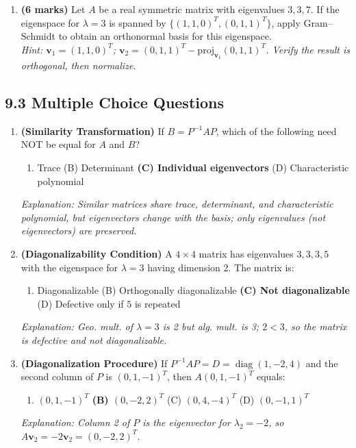 \documentclass[12pt,a4paper]{article}
\begin{document}
\begin{enumerate}[leftmargin=*, label=\textbf{D\arabic*.}]
  \item \textbf{(6 marks)} Let $A$ be a real symmetric matrix with eigenvalues $3, 3, 7$. If the eigenspace for $\lambda = 3$ is spanned by $\{(1,1,0)^T, (0,1,1)^T\}$, apply Gram--Schmidt to obtain an orthonormal basis for this eigenspace. \\
  \textit{Hint: $\mathbf{v}_1 = (1,1,0)^T$; $\mathbf{v}_2 = (0,1,1)^T - \text{proj}_{\mathbf{v}_1}(0,1,1)^T$. Verify the result is orthogonal, then normalize.}
\end{enumerate}

\subsection*{9.3 Multiple Choice Questions}

\begin{enumerate}[leftmargin=*, label=\textbf{MCQ\arabic*.}]
  \item \textbf{(Similarity Transformation)} If $B = P^{-1}AP$, which of the following need NOT be equal for $A$ and $B$?
  \begin{enumerate}[label=(\Alph*)]
    \item Trace \quad (B) Determinant \quad \textbf{(C) Individual eigenvectors} \quad (D) Characteristic polynomial
  \end{enumerate}
  \textit{Explanation: Similar matrices share trace, determinant, and characteristic polynomial, but eigenvectors change with the basis; only eigenvalues (not eigenvectors) are preserved.}

  \item \textbf{(Diagonalizability Condition)} A $4\times 4$ matrix has eigenvalues $3, 3, 3, 5$ with the eigenspace for $\lambda=3$ having dimension 2. The matrix is:
  \begin{enumerate}[label=(\Alph*)]
    \item Diagonalizable \quad (B) Orthogonally diagonalizable \quad \textbf{(C) Not diagonalizable} \quad (D) Defective only if $5$ is repeated
  \end{enumerate}
  \textit{Explanation: Geo. mult. of $\lambda=3$ is 2 but alg. mult. is 3; $2 < 3$, so the matrix is defective and not diagonalizable.}

  \item \textbf{(Diagonalization Procedure)} If $P^{-1}AP = D = \operatorname{diag}(1, -2, 4)$ and the second column of $P$ is $(0, 1, -1)^T$, then $A(0,1,-1)^T$ equals:
  \begin{enumerate}[label=(\Alph*)]
    \item $(0, 1, -1)^T$ \quad \textbf{(B) $(0, -2, 2)^T$} \quad (C) $(0, 4, -4)^T$ \quad (D) $(0, -1, 1)^T$
  \end{enumerate}
  \textit{Explanation: Column 2 of $P$ is the eigenvector for $\lambda_2 = -2$, so $A\mathbf{v}_2 = -2\mathbf{v}_2 = (0,-2,2)^T$.}


\end{enumerate}
\end{document}
